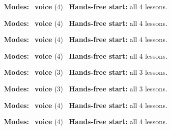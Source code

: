 \expandafter\def\csname hlchaptermodality24\endcsname{%
  {\small\noindent
    \textbf{Modes:} \hlvoicesign{}~\textbf{voice} (4)\quad
    \hlvoicesign{}~\textbf{Hands-free start:} all 4 lessons.%
    \par}\medskip
}

\expandafter\def\csname hlchaptermodality25\endcsname{%
  {\small\noindent
    \textbf{Modes:} \hlvoicesign{}~\textbf{voice} (4)\quad
    \hlvoicesign{}~\textbf{Hands-free start:} all 4 lessons.%
    \par}\medskip
}

\expandafter\def\csname hlchaptermodality26\endcsname{%
  {\small\noindent
    \textbf{Modes:} \hlvoicesign{}~\textbf{voice} (4)\quad
    \hlvoicesign{}~\textbf{Hands-free start:} all 4 lessons.%
    \par}\medskip
}

\expandafter\def\csname hlchaptermodality27\endcsname{%
  {\small\noindent
    \textbf{Modes:} \hlvoicesign{}~\textbf{voice} (4)\quad
    \hlvoicesign{}~\textbf{Hands-free start:} all 4 lessons.%
    \par}\medskip
}

\expandafter\def\csname hlchaptermodality28\endcsname{%
  {\small\noindent
    \textbf{Modes:} \hlvoicesign{}~\textbf{voice} (3)\quad
    \hlvoicesign{}~\textbf{Hands-free start:} all 3 lessons.%
    \par}\medskip
}

\expandafter\def\csname hlchaptermodality29\endcsname{%
  {\small\noindent
    \textbf{Modes:} \hlvoicesign{}~\textbf{voice} (3)\quad
    \hlvoicesign{}~\textbf{Hands-free start:} all 3 lessons.%
    \par}\medskip
}

\expandafter\def\csname hlchaptermodality30\endcsname{%
  {\small\noindent
    \textbf{Modes:} \hlvoicesign{}~\textbf{voice} (4)\quad
    \hlvoicesign{}~\textbf{Hands-free start:} all 4 lessons.%
    \par}\medskip
}

\expandafter\def\csname hlchaptermodality31\endcsname{%
  {\small\noindent
    \textbf{Modes:} \hlvoicesign{}~\textbf{voice} (4)\quad
    \hlvoicesign{}~\textbf{Hands-free start:} all 4 lessons.%
    \par}\medskip
}
